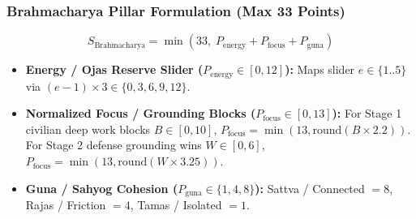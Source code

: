 \documentclass[11pt,a4paper]{article}
\begin{document}
\subsubsection{Brahmacharya Pillar Formulation (Max 33 Points)}
\begin{equation}
    S_{\text{Brahmacharya}} = \min(33,\; P_{\text{energy}} + P_{\text{focus}} + P_{\text{guna}})
\end{equation}
\begin{itemize}[leftmargin=*]
    \item \textbf{Energy / Ojas Reserve Slider ($P_{\text{energy}} \in [0, 12]$):} Maps slider $e \in \{1..5\}$ via $(e - 1) \times 3 \in \{0, 3, 6, 9, 12\}$.
    \item \textbf{Normalized Focus / Grounding Blocks ($P_{\text{focus}} \in [0, 13]$):} For Stage 1 civilian deep work blocks $B \in [0, 10]$, $P_{\text{focus}} = \min(13, \text{round}(B \times 2.2))$. For Stage 2 defense grounding wins $W \in [0, 6]$, $P_{\text{focus}} = \min(13, \text{round}(W \times 3.25))$.
    \item \textbf{Guna / Sahyog Cohesion ($P_{\text{guna}} \in \{1, 4, 8\}$):} Sattva / Connected $= 8$, Rajas / Friction $= 4$, Tamas / Isolated $= 1$.
\end{itemize}
\end{document}
